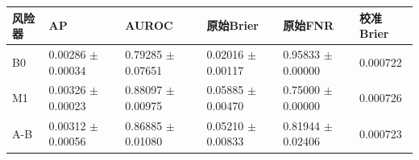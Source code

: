 \begin{tabular}{llllll}
\toprule
风险器 & AP & AUROC & 原始Brier & 原始FNR & 校准Brier \\
\midrule
B0 & 0.00286 $\pm$ 0.00034 & 0.79285 $\pm$ 0.07651 & 0.02016 $\pm$ 0.00117 & 0.95833 $\pm$ 0.00000 & 0.000722 \\
M1 & 0.00326 $\pm$ 0.00023 & 0.88097 $\pm$ 0.00975 & 0.05885 $\pm$ 0.00470 & 0.75000 $\pm$ 0.00000 & 0.000726 \\
A-B & 0.00312 $\pm$ 0.00056 & 0.86885 $\pm$ 0.01080 & 0.05210 $\pm$ 0.00833 & 0.81944 $\pm$ 0.02406 & 0.000723 \\
\bottomrule
\end{tabular}